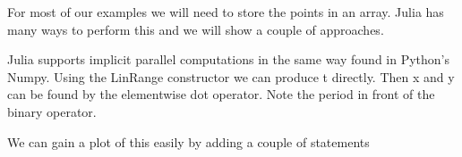 For most of our examples we will need to store the points in an array.
Julia has many ways to perform this and we will show a couple of
approaches.

\hypertarget{lst:basicloop}{%
\label{lst:basicloop}}%
\begin{Shaded}
\begin{Highlighting}[]
\OperatorTok{=} 
\OperatorTok{=}
\OperatorTok{=}
\OperatorTok{=} \OperatorTok{/}

\OperatorTok{=} \OperatorTok{:}
\OperatorTok{=}\OperatorTok{*}
\OperatorTok{=}\OperatorTok{+}
\OperatorTok{=} \OperatorTok{*}\OperatorTok{{-}}
\end{Highlighting}
\end{Shaded}

Julia supports implicit parallel computations in the same way found in
Python's Numpy. Using the LinRange constructor we can produce t
directly. Then x and y can be found by the elementwise dot operator.
Note the period in front of the binary operator.

\hypertarget{lst:basicimplicitloop}{%
\label{lst:basicimplicitloop}}%
\begin{Shaded}
\begin{Highlighting}[]
\OperatorTok{=} \NormalTok{(}\OperatorTok{,} \OperatorTok{,} \NormalTok{)}
\OperatorTok{=}\OperatorTok{+} 
\OperatorTok{=}  \OperatorTok{{-}} 
\end{Highlighting}
\end{Shaded}

We can gain a plot of this easily by adding a couple of statements

\hypertarget{lst:basicplot}{%
\label{lst:basicplot}}%
\begin{Shaded}
\begin{Highlighting}[]
\OperatorTok{=} \NormalTok{(}\OperatorTok{,} \OperatorTok{,} \NormalTok{)}
\OperatorTok{=}\OperatorTok{+} 
\OperatorTok{=}  \OperatorTok{{-}} 
\OperatorTok{,}
\end{Highlighting}
\end{Shaded}

